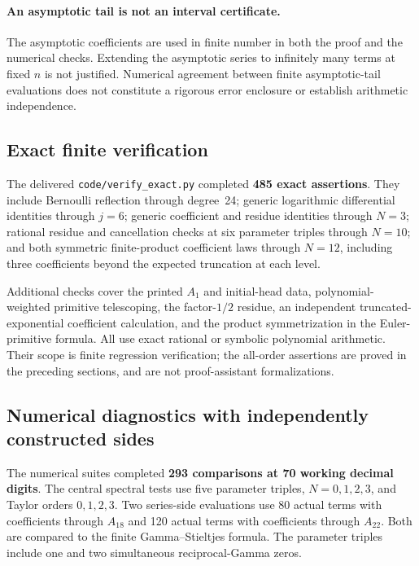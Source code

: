 \documentclass[11pt,letterpaper]{article}
\numberwithin{equation}{section}
\theoremstyle{definition}
\theoremstyle{remark}
\newcommand{\file}[1]{\nolinkurl{#1}}
\begin{document}
\paragraph{An asymptotic tail is not an interval certificate.}
The asymptotic coefficients are used in finite number in both the proof
and the numerical checks. Extending the asymptotic series to infinitely
many terms at fixed $n$ is not justified. Numerical agreement between
finite asymptotic-tail evaluations does not constitute a rigorous error
enclosure or establish arithmetic independence.

\subsection{Exact finite verification}

The delivered \file{code/verify_exact.py} completed \textbf{485 exact
assertions}. They include Bernoulli reflection through degree~24; generic
logarithmic differential identities through $j=6$; generic coefficient
and residue identities through $N=3$; rational residue and cancellation
checks at six parameter triples through $N=10$; and both symmetric
finite-product coefficient laws through $N=12$, including three
coefficients beyond the expected truncation at each level.

Additional checks cover the printed $A_1$ and initial-head data,
polynomial-weighted primitive telescoping, the factor-$1/2$ residue,
an independent truncated-exponential coefficient calculation, and the
product symmetrization in the Euler-primitive formula. All use exact
rational or symbolic polynomial arithmetic. Their scope is finite
regression verification; the all-order assertions are proved in the
preceding sections, and are not proof-assistant formalizations.

\subsection{Numerical diagnostics with independently constructed sides}

The numerical suites completed \textbf{293 comparisons at 70 working
decimal digits}. The central spectral tests use five parameter triples,
$N=0,1,2,3$, and Taylor orders $0,1,2,3$. Two series-side evaluations use
80 actual terms with coefficients through $A_{18}$ and 120 actual terms
with coefficients through $A_{22}$. Both are compared to the finite
Gamma--Stieltjes formula. The parameter triples include one and two
simultaneous reciprocal-Gamma zeros.
\end{document}
